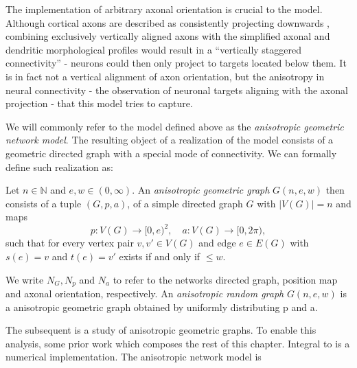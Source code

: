 The implementation of arbitrary axonal orientation is crucial to the
model. Although cortical axons are described as consistently
projecting downwards \parencite[%
cf. Section~\ref{sec:biol_anisotropy}]{Braitenberg_Cortex}, combining
exclusively vertically aligned axons with the simplified axonal and
dendritic morphological profiles would result in a \enquote{vertically
  staggered connectivity} - neurons could then only project to targets
located below them.  It is in fact not a vertical alignment of axon
orientation, but the anisotropy in neural connectivity - the
observation of neuronal targets aligning with the axonal projection -
that this model tries to capture. 



We will commonly refer to the model defined above as the
\textit{anisotropic geometric network model}. The resulting object of
a realization of the model consists of a geometric directed graph
with a special mode of connectivity. We can formally define such
realization as:

\begin{definition}
\label{def:anisotropic_geometric_graph} 
Let $n \in \mathbb{N}$ and $e,w \in (0,\infty)$. An
\textit{anisotropic geometric graph} $G(n,e,w)$ then consists of a
tuple $(G,p,a)$, of a simple directed graph $G$ with $|V(G)|=n$ and
maps \[p:V(G)\to[0,e)^2, \quad a:V(G)\to[0,2\pi),\] such that for every
vertex pair $v,v' \in V(G)$ and edge $e\in E(G)$ with $s(e)=v$ and
$t(e)=v'$ exists if and only if $\le w$. %
\end{definition}

\begin{remark} 
We write $N_G, N_p$ and $N_a$ to refer to the networks directed graph,
position map and axonal orientation, respectively. 
An \textit{anisotropic random graph} $G(n,e,w)$ is a anisotropic
geometric graph obtained by uniformly distributing p and a. %
\end{remark}




The subsequent is a study of anisotropic geometric graphs. To enable
this analysis, some prior work which composes the rest of this
chapter. Integral to is a numerical implementation. The anisotropic
network model is 





